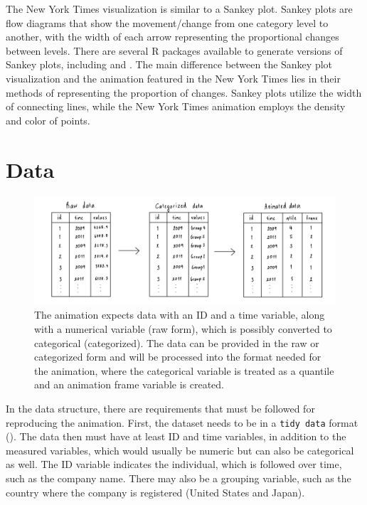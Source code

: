 The New York Times visualization is similar to a Sankey plot. Sankey plots are flow diagrams that show the movement/change from one category level to another, with the width of each arrow representing the proportional changes between levels. There are several R packages available to generate versions of Sankey plots, including  and . The main difference between the Sankey plot visualization and the animation featured in the New York Times lies in their methods of representing the proportion of changes. Sankey plots utilize the width of connecting lines, while the New York Times animation employs the density and color of points.

\section{Data}\label{data}

\begin{figure}

{\centering \includegraphics[width=1\linewidth]{figures/data-diagram} 

}

\caption{The animation expects data with an ID and a time variable, along with a numerical variable (raw form), which is possibly converted to categorical (categorized). The data can be provided in the raw or categorized form and will be processed into the format needed for the animation, where the categorical variable is treated as a quantile and an animation frame variable is created.}\label{fig:data-diagram}
\end{figure}

In the data structure, there are requirements that must be followed for reproducing the animation. First, the dataset needs to be in a \texttt{tidy\ data} format (\citet{tidy-data}). The data then must have at least ID and time variables, in addition to the measured variables, which would usually be numeric but can also be categorical as well. The ID variable indicates the individual, which is followed over time, such as the company name. There may also be a grouping variable, such as the country where the company is registered (United States and Japan).

